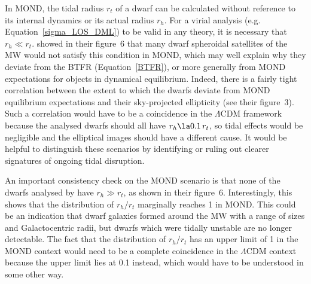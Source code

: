 \documentclass[fleqn,usenatbib,useAMS]{mnras} %
\begin{document}
In MOND, the tidal radius $r_t$ of a dwarf can be calculated without reference to its internal dynamics or its actual radius $r_h$. For a virial analysis (e.g. Equation~\ref{sigma_LOS_DML}) to be valid in any theory, it is necessary that $r_h \ll r_t$. \citet{McGaugh_Wolf_2010} showed in their figure~6 that many dwarf spheroidal satellites of the MW would not satisfy this condition in MOND, which may well explain why they deviate from the BTFR (Equation~\ref{BTFR}), or more generally from MOND expectations for objects in dynamical equilibrium. Indeed, there is a fairly tight correlation between the extent to which the dwarfs deviate from MOND equilibrium expectations and their sky-projected ellipticity (see their figure~3). Such a correlation would have to be a coincidence in the $\Lambda$CDM framework because the analysed dwarfs should all have $r_h \la 0.1 \, r_t$, so tidal effects would be negligible and the elliptical images should have a different cause. It would be helpful to distinguish these scenarios by identifying or ruling out clearer signatures of ongoing tidal disruption.

An important consistency check on the MOND scenario is that none of the dwarfs analysed by \citet{McGaugh_Wolf_2010} have $r_h \gg r_t$, as shown in their figure~6. Interestingly, this shows that the distribution of $r_h/r_t$ marginally reaches 1 in MOND. This could be an indication that dwarf galaxies formed around the MW with a range of sizes and Galactocentric radii, but dwarfs which were tidally unstable are no longer detectable. The fact that the distribution of $r_h/r_t$ has an upper limit of 1 in the MOND context would need to be a complete coincidence in the $\Lambda$CDM context because the upper limit lies at 0.1 instead, which would have to be understood in some other way.
\end{document}
